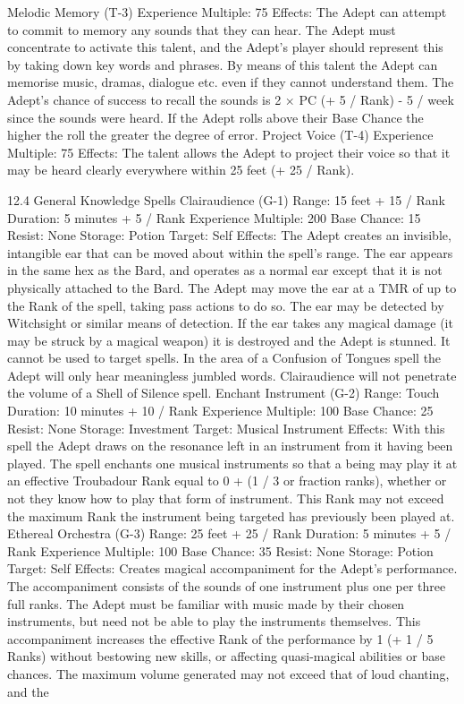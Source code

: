 \documentclass[a4paper]{article}
\begin{document}
\begin{multicols}{3}
Melodic Memory (T-3)
Experience Multiple: 75
Effects: The Adept can attempt to commit to memory any sounds that they can hear. The Adept must
concentrate to activate this talent, and the Adept’s
player should represent this by taking down key
words and phrases. By means of this talent the
Adept can memorise music, dramas, dialogue etc.
even if they cannot understand them. The Adept’s
chance of success to recall the sounds is 2 × PC (+
5 / Rank) - 5 / week since the sounds were heard. If
the Adept rolls above their Base Chance the higher
the roll the greater the degree of error.
Project Voice (T-4)
Experience Multiple: 75
Effects: The talent allows the Adept to project their
voice so that it may be heard clearly everywhere
within 25 feet (+ 25 / Rank).

12.4 General Knowledge Spells
Clairaudience (G-1)
Range: 15 feet + 15 / Rank
Duration: 5 minutes + 5 / Rank
Experience Multiple: 200
Base Chance: 15%
Resist: None
Storage: Potion
Target: Self
Effects: The Adept creates an invisible, intangible
ear that can be moved about within the spell’s
range. The ear appears in the same hex as the Bard,
and operates as a normal ear except that it is not
physically attached to the Bard. The Adept may
move the ear at a TMR of up to the Rank of the
spell, taking pass actions to do so. The ear may be
detected by Witchsight or similar means of detection. If the ear takes any magical damage (it may
be struck by a magical weapon) it is destroyed and
the Adept is stunned. It cannot be used to target
spells. In the area of a Confusion of Tongues spell
the Adept will only hear meaningless jumbled
words. Clairaudience will not penetrate the volume
of a Shell of Silence spell.
Enchant Instrument (G-2)
Range: Touch
Duration: 10 minutes + 10 / Rank
Experience Multiple: 100
Base Chance: 25%
Resist: None
Storage: Investment
Target: Musical Instrument
Effects: With this spell the Adept draws on the
resonance left in an instrument from it having been
played. The spell enchants one musical instruments
so that a being may play it at an effective Troubadour Rank equal to 0 + (1 / 3 or fraction ranks),
whether or not they know how to play that form of
instrument. This Rank may not exceed the maximum Rank the instrument being targeted has previously been played at.
Ethereal Orchestra (G-3)
Range: 25 feet + 25 / Rank
Duration: 5 minutes + 5 / Rank
Experience Multiple: 100
Base Chance: 35%
Resist: None
Storage: Potion
Target: Self
Effects: Creates magical accompaniment for the
Adept’s performance. The accompaniment consists
of the sounds of one instrument plus one per three
full ranks. The Adept must be familiar with music
made by their chosen instruments, but need not be
able to play the instruments themselves. This accompaniment increases the effective Rank of the
performance by 1 (+ 1 / 5 Ranks) without bestowing new skills, or affecting quasi-magical abilities
or base chances. The maximum volume generated
may not exceed that of loud chanting, and the


\end{multicols}
\end{document}
